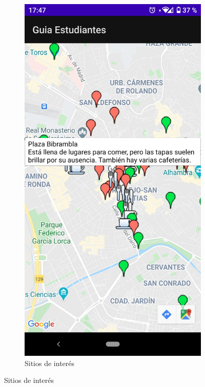 \documentclass[a4paper,11pt]{article}
\begin{document}
\begin{figure}[H]
\begin{subfigure}{0.41\textwidth}
  \label{fig:sub-first}
\end{subfigure}
\hspace{1 cm}
\begin{subfigure}{0.41\textwidth}
  \raggedright
  \includegraphics[width=1\linewidth]{imagenes/mapa.jpeg}  
  \caption{Sitios de interés}
  \label{fig:sub-second}
\end{subfigure}
\end{figure}
\end{document}
